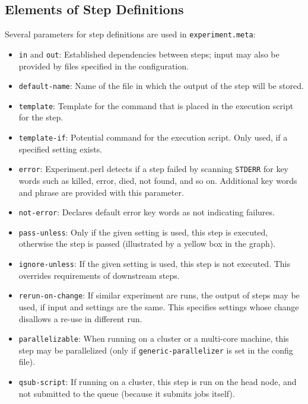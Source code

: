 \documentclass{pbml}
\begin{document}
\subsection{Elements of Step Definitions}

Several parameters for step definitions are used in {\tt experiment.meta}:

\begin{itemize}
\item {\tt in} and {\tt out}: Established dependencies between steps; input may also be provided by files specified in the configuration.

\item {\tt default-name}: Name of the file in which the output of the step will be stored.

\item {\tt template}: Template for the command that is placed in the execution script for the step.

\item {\tt template-if}: Potential command for the execution script. Only used, if a specified setting exists.

\item {\tt error}: Experiment.perl detects if a step failed by scanning {\tt STDERR} for key words such as killed, error, died, not found, and so on. Additional key words and phrase are provided with this parameter.

\item {\tt not-error}: Declares default error key words as not indicating failures.

\item {\tt pass-unless}: Only if the given setting is used, this step is executed, otherwise the step is passed (illustrated by a yellow box in the graph).

\item {\tt ignore-unless}: If the given setting is used, this step is not executed. This overrides requirements of downstream steps.

\item {\tt rerun-on-change}: If similar experiment are runs, the output of steps may be used, if input and settings are the same. This specifies settings whose change disallows a re-use in different run.

\item {\tt parallelizable}: When running on a cluster or a multi-core machine, this step may be parallelized (only if {\tt generic-parallelizer} is set in the config file).

\item {\tt qsub-script}: If running on a cluster, this step is run on the head node, and not submitted to the queue (because it submits jobs itself).

\end{itemize}
\end{document}
